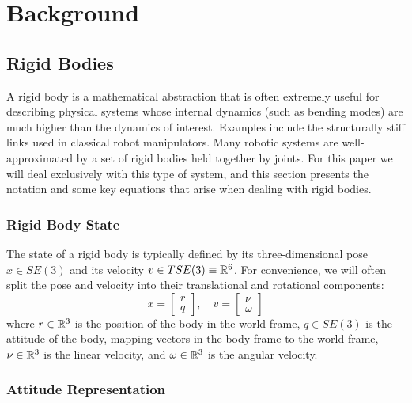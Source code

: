 \documentclass[conference]{IEEEtran}
\begin{document}
\section{Background}
\subsection{Rigid Bodies}
A rigid body is a mathematical abstraction that is often extremely useful for describing 
physical systems whose internal dynamics (such as bending modes) are much higher than the 
dynamics of interest. Examples include the structurally stiff links used in classical 
robot manipulators. Many robotic systems are well-approximated by a set of rigid bodies 
held together by joints. For this paper we will deal exclusively with this type of system,
and this section presents the notation and some key equations that arise when dealing with
rigid bodies.

\subsubsection{Rigid Body State}

The state of a rigid body is typically defined by its three-dimensional pose $x \in SE(3)$
and its velocity $v \in TSE(3) \equiv \mathbb{R}^6$. For convenience, we will often split the 
pose and velocity into their translational and rotational components:
\begin{equation}
    x = \begin{bmatrix}
        r \\ q
    \end{bmatrix}, \quad 
    v = \begin{bmatrix}
        \nu \\ \omega     
    \end{bmatrix}
\end{equation}
where $r \in \mathbb{R}^3$ is the position of the body in the world frame, $q \in SE(3)$ is the 
attitude of the body, mapping vectors in the body frame to the world frame, $\nu \in \mathbb{R}^3$ 
is the linear velocity, and $\omega \in \mathbb{R}^3$ is the angular velocity. 

\subsubsection{Attitude Representation}
\end{document}

